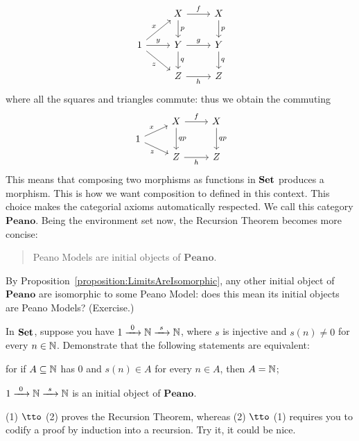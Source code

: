\begin{example}[Recursion]
\[\begin{tikzcd}
& X \ar["f", r] \ar["p", d] & X \ar["p", d] \\
1 \ar["x", ur] \ar["y", r] \ar["z", dr, swap] & Y \ar["g", r] \ar["q", d] & Y \ar["q", d] \\
& Z \ar["h", r, swap] & Z
\end{tikzcd}\]
where all the squares and triangles commute: thus we obtain the commuting
\[\begin{tikzcd}[row sep=tiny]
& X \ar["f", r] \ar["qp", dd] & X \ar["qp", dd] \\
1 \ar["x", ur] \ar["z", dr, swap] \\
& Z \ar["h", r, swap] & Z
\end{tikzcd}\] This means that composing two morphisms as functions in \(\mathbf{Set}\) produces a morphism. This is how we want composition to defined in this context. This choice makes the categorial axioms automatically respected. We call this category \(\mathbf{Peano}\). \newline
Being the environment set now, the Recursion Theorem becomes more concise:
\begin{quotation}
Peano Models are initial objects of \(\mathbf{Peano}\). 
\end{quotation}
By Proposition~\ref{proposition:LimitsAreIsomorphic}, any other initial object of \(\mathbf{Peano}\) are isomorphic to some Peano Model: does this mean its initial objects are Peano Models? (Exercise.)
\end{example}

\begin{exercise}
In \(\mathbf{Set}\), suppose you have \(1 \xrightarrow{\ 0\ } \mathbb N \xrightarrow{\ s\ } \mathbb N\), where \(s\) is injective and \(s(n) \ne 0\) for every \(n \in \mathbb N\). Demonstrate that the following statements are equivalent:
\begin{tcbenum}
\item for if \(A \subseteq \mathbb N\) has \(0\) and \(s(n) \in A\) for every \(n \in A\), then \(A = \mathbb N\);
\item \(1 \xrightarrow{\ 0\ } \mathbb N \xrightarrow{\ s\ } \mathbb N\) is an initial object of \(\mathbf{Peano}\).
\end{tcbenum} 
(1) \(\tto\) (2) proves the Recursion Theorem, whereas (2) \(\tto\) (1) requires you to codify a proof by induction into a recursion. Try it, it could be nice. 
\end{exercise}

